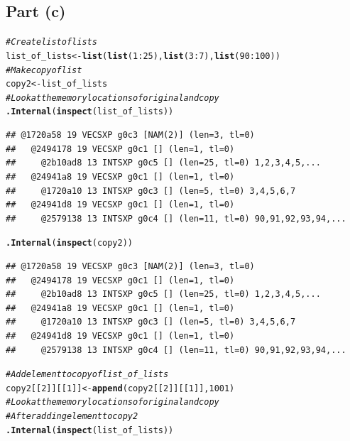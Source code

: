 \documentclass{article}\usepackage[]{graphicx}\usepackage[]{color}
\makeatletter
\newcommand{\hlnum}[1]{\textcolor[rgb]{0.686,0.059,0.569}{#1}}%
\newcommand{\hlcom}[1]{\textcolor[rgb]{0.678,0.584,0.686}{\textit{#1}}}%
\newcommand{\hlopt}[1]{\textcolor[rgb]{0,0,0}{#1}}%
\newcommand{\hlstd}[1]{\textcolor[rgb]{0.345,0.345,0.345}{#1}}%
\newcommand{\hlkwb}[1]{\textcolor[rgb]{0.69,0.353,0.396}{#1}}%
\newcommand{\hlkwd}[1]{\textcolor[rgb]{0.737,0.353,0.396}{\textbf{#1}}}%
\newenvironment{kframe}{%
 \def\at@end@of@kframe{}%
 \ifinner\ifhmode%
  \def\at@end@of@kframe{\end{minipage}}%
  \begin{minipage}{\columnwidth}%
 \fi\fi%
 \def\FrameCommand##1{\hskip\@totalleftmargin \hskip-\fboxsep
 \colorbox{shadecolor}{##1}\hskip-\fboxsep
     \hskip-\linewidth \hskip-\@totalleftmargin \hskip\columnwidth}%
 \MakeFramed {\advance\hsize-\width
   \@totalleftmargin\z@ \linewidth\hsize
   \@setminipage}}%
 {\par\unskip\endMakeFramed%
 \at@end@of@kframe}
\newenvironment{knitrout}{}{} %
\makeatother
\begin{document}
\subsection{Part (c)}
\begin{knitrout}
\color{fgcolor}\begin{kframe}
\begin{alltt}
\hlcom{#Create list of lists}
\hlstd{list_of_lists} \hlkwb{<-} \hlkwd{list}\hlstd{(}\hlkwd{list}\hlstd{(}\hlnum{1}\hlopt{:}\hlnum{25}\hlstd{),} \hlkwd{list}\hlstd{(}\hlnum{3}\hlopt{:}\hlnum{7}\hlstd{),} \hlkwd{list}\hlstd{(}\hlnum{90}\hlopt{:}\hlnum{100}\hlstd{))}
\hlcom{#Make copy of list}
\hlstd{copy2} \hlkwb{<-} \hlstd{list_of_lists}
\hlcom{#Look at the memory locations of original and copy}
\hlkwd{.Internal}\hlstd{(}\hlkwd{inspect}\hlstd{(list_of_lists))}
\end{alltt}
\begin{verbatim}
## @1720a58 19 VECSXP g0c3 [NAM(2)] (len=3, tl=0)
##   @2494178 19 VECSXP g0c1 [] (len=1, tl=0)
##     @2b10ad8 13 INTSXP g0c5 [] (len=25, tl=0) 1,2,3,4,5,...
##   @24941a8 19 VECSXP g0c1 [] (len=1, tl=0)
##     @1720a10 13 INTSXP g0c3 [] (len=5, tl=0) 3,4,5,6,7
##   @24941d8 19 VECSXP g0c1 [] (len=1, tl=0)
##     @2579138 13 INTSXP g0c4 [] (len=11, tl=0) 90,91,92,93,94,...
\end{verbatim}
\begin{alltt}
\hlkwd{.Internal}\hlstd{(}\hlkwd{inspect}\hlstd{(copy2))}
\end{alltt}
\begin{verbatim}
## @1720a58 19 VECSXP g0c3 [NAM(2)] (len=3, tl=0)
##   @2494178 19 VECSXP g0c1 [] (len=1, tl=0)
##     @2b10ad8 13 INTSXP g0c5 [] (len=25, tl=0) 1,2,3,4,5,...
##   @24941a8 19 VECSXP g0c1 [] (len=1, tl=0)
##     @1720a10 13 INTSXP g0c3 [] (len=5, tl=0) 3,4,5,6,7
##   @24941d8 19 VECSXP g0c1 [] (len=1, tl=0)
##     @2579138 13 INTSXP g0c4 [] (len=11, tl=0) 90,91,92,93,94,...
\end{verbatim}
\begin{alltt}
\hlcom{#Add element to copy of list_of_lists}
\hlstd{copy2[[}\hlnum{2}\hlstd{]][[}\hlnum{1}\hlstd{]]} \hlkwb{<-} \hlkwd{append}\hlstd{(copy2[[}\hlnum{2}\hlstd{]][[}\hlnum{1}\hlstd{]],} \hlnum{1001}\hlstd{)}
\hlcom{#Look at the memory locations of original and copy}
\hlcom{#After adding element to copy2}
\hlkwd{.Internal}\hlstd{(}\hlkwd{inspect}\hlstd{(list_of_lists))}
\end{alltt}
\begin{verbatim}

\end{verbatim}
\end{kframe}
\end{knitrout}
\end{document}

